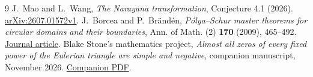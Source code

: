 \documentclass[11pt]{article}
\begin{document}
\small
\begin{thebibliography}{9}
 J.~Mao and L.~Wang, \emph{The Narayana transformation}, Conjecture 4.1 (2026). \href{https://arxiv.org/abs/2607.01572v1}{arXiv:2607.01572v1}.
 J.~Borcea and P.~Br\"and\'en, \emph{P\'olya--Schur master theorems for circular domains and their boundaries}, Ann. of Math. (2) \textbf{170} (2009), 465--492. \href{https://annals.math.princeton.edu/2009/170-1/p14}{Journal article}.
 Blake Stone's mathematics project, \emph{Almost all zeros of every fixed power of the Eulerian triangle are simple and negative}, companion manuscript, November 2026. \href{https://github.com/blakestone-x/math/blob/c431a4464010f469f9c7a647da7c783c164977c4/Eulerian-matrix-powers/bulk.pdf}{Companion PDF}.
\end{thebibliography}
\end{document}
